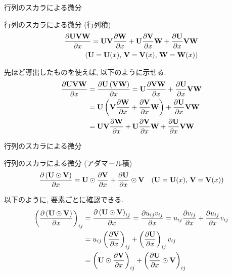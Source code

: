 \documentclass[dvipdfmx,notheorems,t]{beamer}
\begin{document}
\begin{frame}{行列のスカラによる微分}
\begin{block}{行列のスカラによる微分 (行列積)}
  \begin{align*}
    \pdv{\vb{U} \vb{V} \vb{W}}{x} = \vb{U} \vb{V} \pdv{\vb{W}}{x}
      + \vb{U} \pdv{\vb{V}}{x} \vb{W} + \pdv{\vb{U}}{x} \vb{V} \vb{W} \\
      \text{($\vb{U} = \vb{U}(x)$, $\vb{V} = \vb{V}(x)$, $\vb{W} = \vb{W}(x)$)}
  \end{align*}
\end{block}

先ほど導出したものを使えば, 以下のように示せる.
\begin{align*}
  \pdv{\vb{U} \vb{V} \vb{W}}{x} &= \pdv{\vb{U} \left( \vb{V} \vb{W} \right)}{x}
    = \vb{U} \pdv{\vb{V} \vb{W}}{x} + \pdv{\vb{U}}{x} \vb{V} \vb{W} \\
    &= \vb{U} \left( \vb{V} \pdv{\vb{W}}{x} + \pdv{\vb{V}}{x} \vb{W} \right)
      + \pdv{\vb{U}}{x} \vb{V} \vb{W} \\
    &= \vb{U} \vb{V} \pdv{\vb{W}}{x}
      + \vb{U} \pdv{\vb{V}}{x} \vb{W} + \pdv{\vb{U}}{x} \vb{V} \vb{W}
\end{align*}
\end{frame}

\begin{frame}{行列のスカラによる微分}
\begin{block}{行列のスカラによる微分 (アダマール積)}
  \begin{align*}
    \pdv{\left( \vb{U} \odot \vb{V} \right)}{x}
      &= \vb{U} \odot \pdv{\vb{V}}{x} + \pdv{\vb{U}}{x} \odot \vb{V}
      & \text{($\vb{U} = \vb{U}(x)$, $\vb{V} = \vb{V}(x)$)}
  \end{align*}
\end{block}

以下のように, 要素ごとに確認できる.
\begin{align*}
  \left( \pdv{\left( \vb{U} \odot \vb{V} \right)}{x} \right)_{ij}
    &= \pdv{\left( \vb{U} \odot \vb{V} \right)_{ij}}{x}
    = \pdv{u_{ij} v_{ij}}{x}
    = u_{ij} \pdv{v_{ij}}{x} + \pdv{u_{ij}}{x} v_{ij} \\
    &= u_{ij} \left( \pdv{\vb{V}}{x} \right)_{ij} + \left( \pdv{\vb{U}}{x} \right)_{ij} v_{ij} \\
    &= \left( \vb{U} \odot \pdv{\vb{V}}{x} \right)_{ij}
      + \left( \pdv{\vb{U}}{x} \odot \vb{V} \right)_{ij}
\end{align*}
\end{frame}
\end{document}
